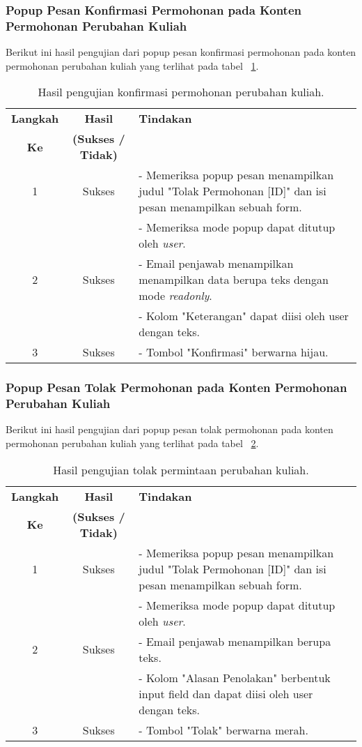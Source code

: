 \subsubsection{Popup Pesan Konfirmasi Permohonan pada Konten Permohonan Perubahan Kuliah}
Berikut ini hasil pengujian dari popup pesan konfirmasi permohonan pada konten permohonan perubahan kuliah yang terlihat pada tabel ~\ref{hasil:KonfirmasiPerubahanKuliah}.
\begin{table}[H]
	\centering 
	\caption{Hasil pengujian konfirmasi permohonan perubahan kuliah.}
	\label{hasil:KonfirmasiPerubahanKuliah}
	\begin{tabular}{|c| c| p{}|}
		\toprule
		\textbf{Langkah} & \textbf{Hasil} & \textbf{Tindakan}\\
		\textbf{Ke} & \textbf{(Sukses / Tidak)} &\\
		\midrule
		1&Sukses& - Memeriksa popup pesan menampilkan judul "Tolak Permohonan [ID]" dan isi pesan menampilkan sebuah form.\\
		&& - Memeriksa mode popup dapat ditutup oleh \textit{user}.\\
		\hline
		2&Sukses& - Email penjawab menampilkan menampilkan data berupa teks dengan mode \textit{readonly}.\\
		&& - Kolom "Keterangan" dapat diisi oleh user dengan teks.\\
		\hline
		3&Sukses&- Tombol "Konfirmasi" berwarna hijau.\\			
		\bottomrule		
	\end{tabular} 
\end{table}

\subsubsection{Popup Pesan Tolak Permohonan pada Konten Permohonan Perubahan Kuliah}
Berikut ini hasil pengujian dari popup pesan tolak permohonan pada konten permohonan perubahan kuliah yang terlihat pada tabel ~\ref{hasil:TolakPerubahanKuliah}.
\begin{table}[H]
	\centering 
	\caption{Hasil pengujian tolak permintaan perubahan kuliah.}
	\label{hasil:TolakPerubahanKuliah}
	\begin{tabular}{|c| c| p{}|}
		\toprule
		\textbf{Langkah} & \textbf{Hasil} & \textbf{Tindakan}\\
		\textbf{Ke} & \textbf{(Sukses / Tidak)} &\\
		\midrule
		1&Sukses& - Memeriksa popup pesan menampilkan judul "Tolak Permohonan [ID]" dan isi pesan menampilkan sebuah form.\\
		&& - Memeriksa mode popup dapat ditutup oleh \textit{user}.\\
		\hline
		2&Sukses& - Email penjawab menampilkan berupa teks.\\
		&& - Kolom "Alasan Penolakan" berbentuk input field dan dapat diisi oleh user dengan teks.\\
		\hline
		3&Sukses&- Tombol "Tolak" berwarna merah.\\		
		\bottomrule		
	\end{tabular} 
\end{table}

